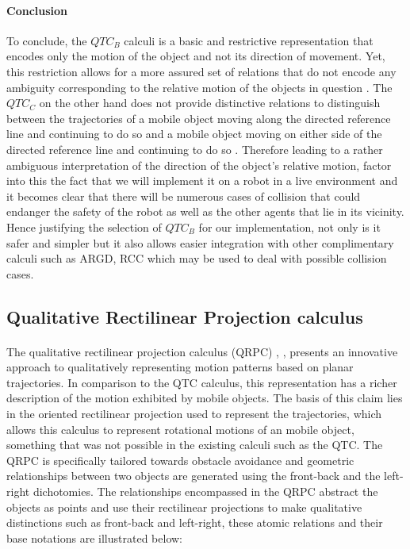 	\paragraph{Conclusion}To conclude, the $QTC_B$ calculi is a basic and restrictive representation that encodes only the motion of the object and not its direction of movement. Yet, this restriction allows for a more assured set of relations that do not encode any ambiguity corresponding to the relative motion of the objects in question \cite{van2004representing}. The $QTC_C$ on the other hand does not provide distinctive relations to distinguish between the trajectories of a mobile object moving along the directed reference line and continuing to do so and a mobile object moving on either side of the directed reference line and continuing to do so \cite{van2005qualitative}. Therefore leading to a rather ambiguous interpretation of the direction of the object's relative motion, factor into this the fact that we will implement it on a robot in a live environment and it becomes clear that there will be numerous cases of collision that could endanger the safety of the robot as well as the other agents that lie in its vicinity.  Hence justifying the selection of $QTC_B$ for our implementation, not only is it safer and simpler but it also allows easier integration with other complimentary calculi such as ARGD, RCC which may be used to deal with possible collision cases.

	\subsection{Qualitative Rectilinear Projection calculus}
	\paragraph{}The qualitative rectilinear projection calculus (QRPC) \cite{glez2013qrpc}, \cite{alvarez2006guide},  \cite{delafontaine2011implementing} presents an innovative approach to qualitatively representing motion patterns based on planar trajectories. In comparison to the QTC calculus, this representation has a richer description of the motion exhibited by mobile objects. The basis of this claim lies in the oriented rectilinear projection used to represent the trajectories, which allows this calculus to represent rotational motions of an mobile object, something that was not possible in the existing calculi such as the QTC. The QRPC is specifically tailored towards obstacle avoidance and geometric relationships between two objects are generated using the front-back and the left-right dichotomies. The relationships encompassed in the QRPC abstract the objects as points and use their rectilinear projections to make qualitative distinctions such as front-back and left-right, these atomic relations and their base notations are illustrated below:
	
